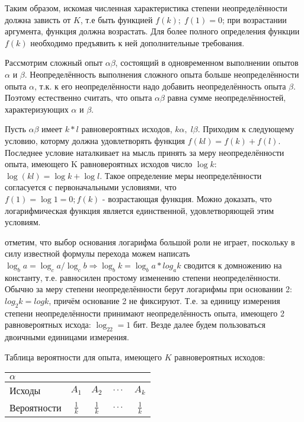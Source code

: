 \documentclass[a4paper,12pt]{report}
\begin{document}
	Таким образом, искомая численная характеристика степени неопределённости должна зависть от $K$, т.е быть функцией $f(k); \; f(1)=0$; при возрастании аргумента, функция должна возрастать. Для более полного определения функции $f(k)$ необходимо предъявить к ней дополнительные требования. 
	
	Рассмотрим сложный опыт $\alpha\beta$, состоящий в одновременном выполнении опытов $\alpha$ и $\beta$. Неопределённость выполнения сложного опыта больше неопределённости опыта $\alpha$, т.к. к его неопределённости надо добавить неопределённость опыта $\beta$. Поэтому естественно считать, что  опыта $\alpha\beta$ равна сумме неопределённостей, характеризующих $\alpha$ и $\beta$.
	
	Пусть $\alpha \beta$ имеет $k*l$ равновероятных исходов, $k\alpha, \; l\beta$. Приходим к следующему условию, которму должна удовлетворять функция $f(kl) = f(k) + f(l)$. Последнее условие наталкивает на мысль принять за меру неопределённости опыта, имеющего K равновероятных исходов число $\log k$: $\log(kl) = \log k + \log l$. Такое определение меры неопределённости согласуется с первоначальными условиями, что $f(1) = \log1 = 0; f(k) \mbox{ - возрастающая функция}$. Можно доказать, что логарифмическая функция является единственной, удовлетворяющей этим условиям.


 	 отметим, что выбор основания логарифма большой роли не играет, поскольку в силу известной формулы перехода можем написать $\log_ba = \log_ca/\log_cb \Rightarrow \log_bk = \log_ba*log_ak$ сводится к домножению на константу, т.е. равносилен простому изменению  степени неопределённости. Обычно за меру степени неопределённости берут логарифмы при основании 2: $log_2k = logk$, причём основание 2 не фиксируют. Т.е. за единицу измерения степени неопределённости принимают неопределённость опыта, имеющего 2 равновероятных исхода: $\log_22 = 1$ бит. Везде далее будем пользоваться двоичными единицами измерения. 

	Таблица вероятности для опыта, имеющего $K$ равновероятных исходов:
	

	\begin{tabular}{|l|c|c|c|c|}
	\hline
		$\alpha$ &&&&\\
	\hline
		Исходы & $A_1$ & $A_2$ & $\,\ldots\,$ & $A_k$ \\
	\hline
		Вероятности& $\frac{1}{k}$& $\frac{1}{k}$ & $\,\ldots\,$ & $\frac{1}{k}$\\
	\hline
	\end{tabular}
\end{document}
